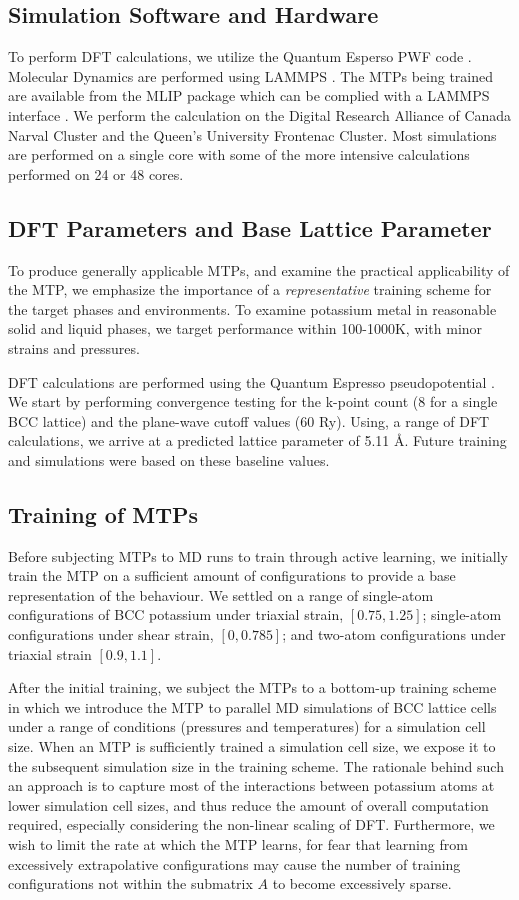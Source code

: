 \documentclass[9pt,twocolumn,twoside]{opticajnl}
\begin{document}
\subsection{Simulation Software and Hardware}
To perform DFT calculations, we utilize the Quantum Esperso PWF code \cite{QE}. Molecular Dynamics are performed using LAMMPS  \cite{LAMMPS}. The MTPs being trained are available from the MLIP package which can be complied with a LAMMPS interface \cite{mlip}. We perform the calculation on the Digital Research Alliance of Canada Narval Cluster and the Queen's University Frontenac Cluster. Most simulations are performed on a single core with some of the more intensive calculations performed on 24 or 48 cores. 

\subsection{DFT Parameters and Base Lattice Parameter}
To produce generally applicable MTPs, and examine the practical applicability of the MTP, we emphasize the importance of a \textit{representative} training scheme for the target phases and environments. To examine potassium metal in reasonable solid and liquid phases, we target performance within 100-1000K, with minor strains and pressures.

DFT calculations are performed using the Quantum Espresso pseudopotential \cite{DFT}. We start by performing convergence testing for the k-point count (8 for a single BCC lattice) and the plane-wave cutoff values (60 Ry). Using, a range of DFT calculations, we arrive at a predicted lattice parameter of 5.11 Å. Future training and simulations were based on these baseline values. 

\subsection{Training of MTPs}
Before subjecting MTPs to MD runs to train through active learning, we initially train the MTP on a sufficient amount of configurations to provide a base representation of the behaviour. We settled on a range of single-atom configurations of BCC potassium under triaxial strain, $[0.75, 1.25]$; single-atom configurations under shear strain, $[0, 0.785]$; and two-atom configurations under triaxial strain $[0.9, 1.1]$. 

After the initial training, we subject the MTPs to a bottom-up training scheme in which we introduce the MTP to parallel MD simulations of BCC lattice cells under a range of conditions (pressures and temperatures) for a simulation cell size. When an MTP is \textit{}{sufficiently trained} a simulation cell size, we expose it to the subsequent simulation size in the training scheme. The rationale behind such an approach is to capture most of the interactions between potassium atoms at lower simulation cell sizes, and thus reduce the amount of overall computation required, especially considering the non-linear scaling of DFT.  Furthermore, we wish to limit the rate at which the MTP learns, for fear that learning from excessively extrapolative configurations may cause the number of training configurations not within the submatrix $A$ to become excessively sparse. 
\end{document}
